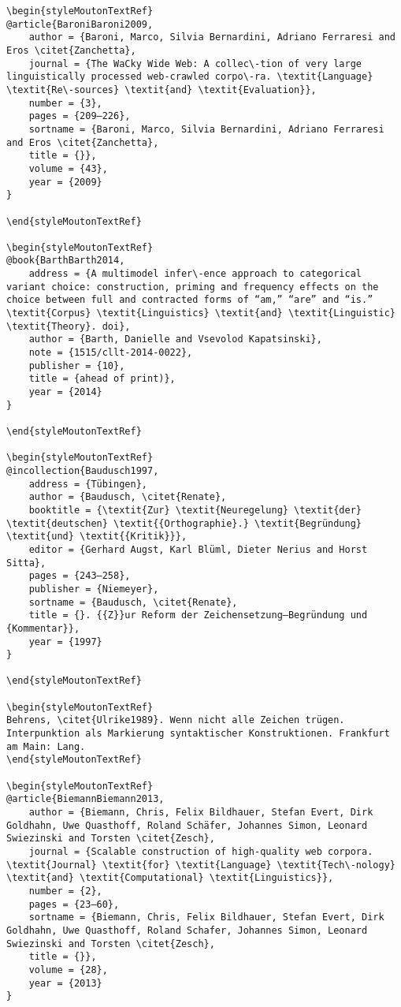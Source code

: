 \begin{styleMoutonHeadingRef}
\begin{verbatim}
\begin{styleMoutonTextRef}
@article{BaroniBaroni2009,
	author = {Baroni, Marco, Silvia Bernardini, Adriano Ferraresi and Eros \citet{Zanchetta},
	journal = {The WaCky Wide Web: A collec\-tion of very large linguistically processed web-crawled corpo\-ra. \textit{Language} \textit{Re\-sources} \textit{and} \textit{Evaluation}},
	number = {3},
	pages = {209–226},
	sortname = {Baroni, Marco, Silvia Bernardini, Adriano Ferraresi and Eros \citet{Zanchetta},
	title = {}},
	volume = {43},
	year = {2009}
}

\end{styleMoutonTextRef}

\begin{styleMoutonTextRef}
@book{BarthBarth2014,
	address = {A multimodel infer\-ence approach to categorical variant choice: construction, priming and frequency effects on the choice between full and contracted forms of “am,” “are” and “is.” \textit{Corpus} \textit{Linguistics} \textit{and} \textit{Linguistic} \textit{Theory}. doi},
	author = {Barth, Danielle and Vsevolod Kapatsinski},
	note = {1515/cllt-2014-0022},
	publisher = {10},
	title = {ahead of print)},
	year = {2014}
}

\end{styleMoutonTextRef}

\begin{styleMoutonTextRef}
@incollection{Baudusch1997,
	address = {Tübingen},
	author = {Baudusch, \citet{Renate},
	booktitle = {\textit{Zur} \textit{Neuregelung} \textit{der} \textit{deutschen} \textit{{Orthographie}.} \textit{Begründung} \textit{und} \textit{{Kritik}}},
	editor = {Gerhard Augst, Karl Blüml, Dieter Nerius and Horst Sitta},
	pages = {243–258},
	publisher = {Niemeyer},
	sortname = {Baudusch, \citet{Renate},
	title = {}. {{Z}}ur Reform der Zeichensetzung—Begründung und {Kommentar}},
	year = {1997}
}

\end{styleMoutonTextRef}

\begin{styleMoutonTextRef}
Behrens, \citet{Ulrike1989}. Wenn nicht alle Zeichen trügen. Interpunktion als Markierung syntaktischer Konstruktionen. Frankfurt am Main: Lang.
\end{styleMoutonTextRef}

\begin{styleMoutonTextRef}
@article{BiemannBiemann2013,
	author = {Biemann, Chris, Felix Bildhauer, Stefan Evert, Dirk Goldhahn, Uwe Quasthoff, Roland Schäfer, Johannes Simon, Leonard Swiezinski and Torsten \citet{Zesch},
	journal = {Scalable construction of high-quality web corpora. \textit{Journal} \textit{for} \textit{Language} \textit{Tech\-nology} \textit{and} \textit{Computational} \textit{Linguistics}},
	number = {2},
	pages = {23–60},
	sortname = {Biemann, Chris, Felix Bildhauer, Stefan Evert, Dirk Goldhahn, Uwe Quasthoff, Roland Schafer, Johannes Simon, Leonard Swiezinski and Torsten \citet{Zesch},
	title = {}},
	volume = {28},
	year = {2013}
}


\end{verbatim}
\end{styleMoutonHeadingRef}
